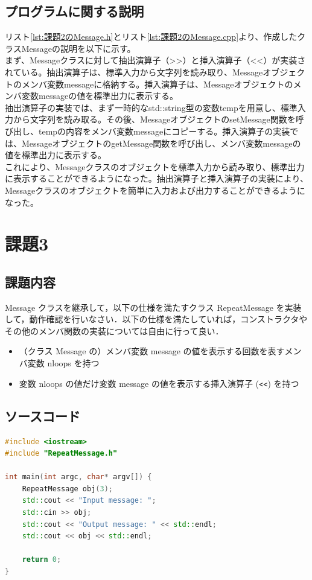 \documentclass[paper=a4,fontsize=11pt]{jlreq}
\begin{document}
\subsection{プログラムに関する説明}
リスト\ref{lst:課題2のMessage.h}とリスト\ref{lst:課題2のMessage.cpp}より、作成したクラスMessageの説明を以下に示す。\\
まず、Messageクラスに対して抽出演算子（>>）と挿入演算子（<<）が実装されている。抽出演算子は、標準入力から文字列を読み取り、Messageオブジェクトのメンバ変数messageに格納する。挿入演算子は、Messageオブジェクトのメンバ変数messageの値を標準出力に表示する。\\
抽出演算子の実装では、まず一時的なstd::string型の変数tempを用意し、標準入力から文字列を読み取る。その後、MessageオブジェクトのsetMessage関数を呼び出し、tempの内容をメンバ変数messageにコピーする。挿入演算子の実装では、MessageオブジェクトのgetMessage関数を呼び出し、メンバ変数messageの値を標準出力に表示する。\\
これにより、Messageクラスのオブジェクトを標準入力から読み取り、標準出力に表示することができるようになった。抽出演算子と挿入演算子の実装により、Messageクラスのオブジェクトを簡単に入力および出力することができるようになった。


\section{課題3}
\subsection{課題内容}
Message クラスを継承して，以下の仕様を満たすクラス RepeatMessage を実装して，動作確認を行いなさい．以下の仕様を満たしていれば，コンストラクタやその他のメンバ関数の実装については自由に行って良い． %

\begin{itemize}
    \item （クラス Message の）メンバ変数 message の値を表示する回数を表すメンバ変数 nloops を持つ %
    \item 変数 nloops の値だけ変数 message の値を表示する挿入演算子 (\texttt{<<}) を持つ %
\end{itemize}

\subsection{ソースコード}
\begin{lstlisting}[caption={課題3のmain.cpp}, language=C++, label={lst:課題3のmain.cpp}]
#include <iostream>
#include "RepeatMessage.h"

int main(int argc, char* argv[]) {
    RepeatMessage obj(3);
    std::cout << "Input message: ";
    std::cin >> obj;
    std::cout << "Output message: " << std::endl;
    std::cout << obj << std::endl;

    return 0;
}
\end{lstlisting}
\end{document}
